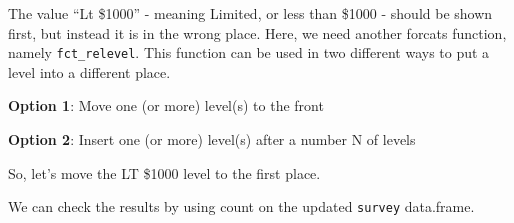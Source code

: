 \documentclass[]{tufte-book}
\newenvironment{Shaded}{}{}
\newcommand{\DataTypeTok}[1]{\textcolor[rgb]{0.56,0.13,0.00}{#1}}
\newcommand{\KeywordTok}[1]{\textcolor[rgb]{0.00,0.44,0.13}{\textbf{#1}}}
\newcommand{\NormalTok}[1]{#1}
\newcommand{\OperatorTok}[1]{\textcolor[rgb]{0.40,0.40,0.40}{#1}}
\newcommand{\StringTok}[1]{\textcolor[rgb]{0.25,0.44,0.63}{#1}}
\begin{document}
The value ``Lt \$1000'' - meaning Limited, or less than \$1000 - should be shown first, but instead it is in the wrong place. Here, we need another forcats function, namely \texttt{fct\_relevel}. This function can be used in two different ways to put a level into a different place.

\textbf{Option 1}: Move one (or more) level(s) to the front

\begin{Shaded}
\end{Shaded}

\textbf{Option 2}: Insert one (or more) level(s) after a number N of levels

\begin{Shaded}
\end{Shaded}

So, let's move the LT \$1000 level to the first place.

\begin{Shaded}
\end{Shaded}

We can check the results by using count on the updated \texttt{survey} data.frame.

\begin{Shaded}
\end{Shaded}
\end{document}
